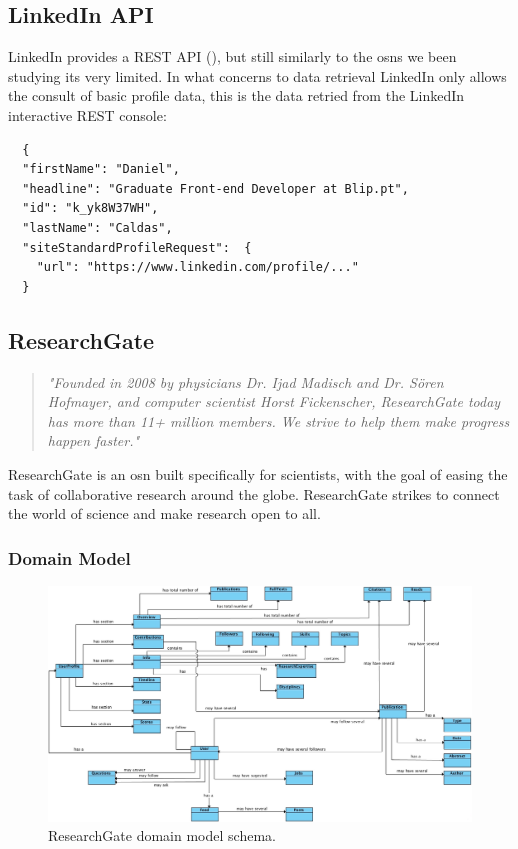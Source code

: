 \subsection*{LinkedIn API}
LinkedIn provides a REST API (\cite{linkapi}), but still similarly to the \glspl{osn} we been studying its very limited. In what concerns to data retrieval LinkedIn only allows
the consult of basic profile data, this is the data retried from the LinkedIn interactive REST console:\\

\begin{verbatim}
  {
  "firstName": "Daniel",
  "headline": "Graduate Front-end Developer at Blip.pt",
  "id": "k_yk8W37WH",
  "lastName": "Caldas",
  "siteStandardProfileRequest":  {
    "url": "https://www.linkedin.com/profile/..."
  }
\end{verbatim}

\subsection{ResearchGate}

\begin{quote}
\textit{"Founded in 2008 by physicians Dr. Ijad Madisch and Dr. Sören Hofmayer, and computer scientist
Horst Fickenscher, ResearchGate today has more than 11+ million members. We strive to help them make progress happen faster."} \cite{rgate}
\end{quote}

ResearchGate is an \gls{osn} built specifically for scientists, with the goal of easing the task of collaborative research around the globe. ResearchGate
strikes to connect the world of science and make research open to all.
\clearpage

\subsubsection*{Domain Model}

\begin{figure}[h!]
  \hspace*{-1in}
  \includegraphics[width=1.20\textwidth]{img/researchgate-domain-model.jpg}
\caption{\label{img:rgatedomain} ResearchGate domain model schema.}
\end{figure}

